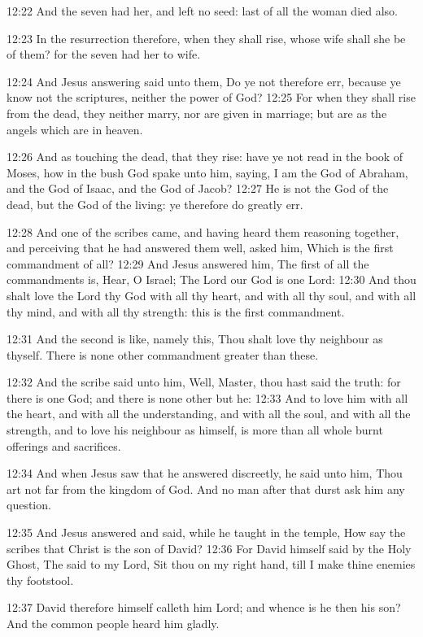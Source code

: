 12:22 And the seven had her, and left no seed: last of all the woman died also.

12:23 In the resurrection therefore, when they shall rise, whose wife shall she be of them? for the seven had her to wife.

12:24 And Jesus answering said unto them, Do ye not therefore err, because ye know not the scriptures, neither the power of God?  12:25 For when they shall rise from the dead, they neither marry, nor are given in marriage; but are as the angels which are in heaven.

12:26 And as touching the dead, that they rise: have ye not read in the book of Moses, how in the bush God spake unto him, saying, I am the God of Abraham, and the God of Isaac, and the God of Jacob?  12:27 He is not the God of the dead, but the God of the living: ye therefore do greatly err.

12:28 And one of the scribes came, and having heard them reasoning together, and perceiving that he had answered them well, asked him, Which is the first commandment of all?  12:29 And Jesus answered him, The first of all the commandments is, Hear, O Israel; The Lord our God is one Lord: 12:30 And thou shalt love the Lord thy God with all thy heart, and with all thy soul, and with all thy mind, and with all thy strength: this is the first commandment.

12:31 And the second is like, namely this, Thou shalt love thy neighbour as thyself. There is none other commandment greater than these.

12:32 And the scribe said unto him, Well, Master, thou hast said the truth: for there is one God; and there is none other but he: 12:33 And to love him with all the heart, and with all the understanding, and with all the soul, and with all the strength, and to love his neighbour as himself, is more than all whole burnt offerings and sacrifices.

12:34 And when Jesus saw that he answered discreetly, he said unto him, Thou art not far from the kingdom of God. And no man after that durst ask him any question.

12:35 And Jesus answered and said, while he taught in the temple, How say the scribes that Christ is the son of David?  12:36 For David himself said by the Holy Ghost, The \LORD said to my Lord, Sit thou on my right hand, till I make thine enemies thy footstool.

12:37 David therefore himself calleth him Lord; and whence is he then his son? And the common people heard him gladly.

